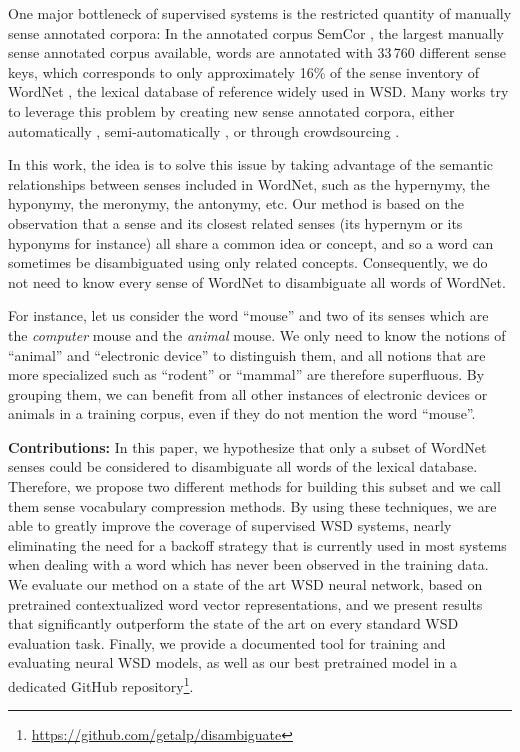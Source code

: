 \documentclass[11pt]{article}
\newcommand{\tit}[1]{\textit{#1}}
\newcommand{\tbf}[1]{\textbf{#1}}
\newcommand{\citep}[1]{\cite{#1}}
\begin{document}
One major bottleneck of supervised systems is the restricted quantity of manually sense annotated corpora: In the annotated corpus SemCor \citep{Miller1993}, the largest manually sense annotated corpus available, words are annotated with 33\,760 different sense keys, which corresponds to only approximately 16\% of the sense inventory of
WordNet \citep{miller1995wordnet},
the lexical database of reference widely used in WSD.
Many works try to leverage this problem by creating new sense annotated corpora, either automatically \citep{pasini2017}, semi-automatically \citep{taghipourng2015}, or through crowdsourcing \citep{yuan_2016}. 

In this work, the idea is to solve this issue by taking advantage of the semantic relationships between senses included in WordNet, such as the hypernymy, the hyponymy, the meronymy, the antonymy, etc. Our method is based on the 
observation that a sense and its closest related senses (its hypernym or its hyponyms for instance) all share a common idea or concept, 
and so a word can sometimes be disambiguated using only related concepts. Consequently, we do not need to know every sense of WordNet to disambiguate all words of WordNet.


For instance, let us consider the word ``mouse'' and two of its senses which are the \tit{computer} mouse and the \tit{animal} mouse. We only need to know the notions of ``animal'' and ``electronic device'' to distinguish them, and all notions that are more specialized such as ``rodent'' or ``mammal'' are therefore superfluous. By grouping them, we can benefit from all other instances of electronic devices or animals in a training corpus, even if they do not mention the word ``mouse''.

\noindent\tbf{Contributions:}
In this paper, we hypothesize that only a subset of WordNet senses could be considered to disambiguate all words of the lexical database. Therefore, we propose two different methods for building this subset and we call them sense vocabulary compression methods. 
By using these techniques, we are able to greatly improve the coverage 
of supervised WSD systems, nearly eliminating the need for a backoff strategy that is currently used in most systems when dealing with a word which has never been observed in the training data.
We evaluate our method on a state of the art WSD neural network,
based on pretrained contextualized word vector representations, 
and we present results that significantly outperform the state of the art on every standard WSD evaluation task. Finally, we provide a documented tool for training and evaluating neural WSD models, as well as our best pretrained model in a 
dedicated 
GitHub repository\footnote{
\url{https://github.com/getalp/disambiguate}}.
\end{document}
